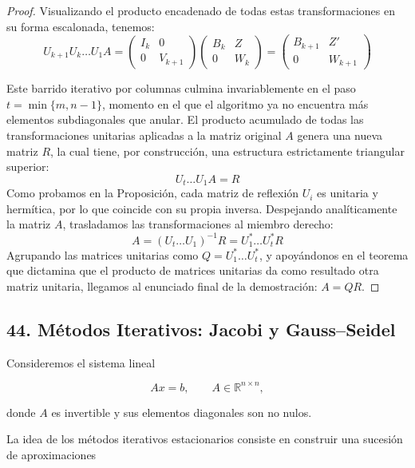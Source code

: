\documentclass[12pt]{article}
\begin{document}
\begin{proof}
Visualizando el producto encadenado de todas estas transformaciones en su forma escalonada, tenemos:
\begin{equation}
U_{k+1} U_k \dots U_1 A = \begin{pmatrix} I_k & 0 \\ 0 & V_{k+1} \end{pmatrix} \begin{pmatrix} B_k & Z \\ 0 & W_k \end{pmatrix} = \begin{pmatrix} B_{k+1} & Z' \\ 0 & W_{k+1} \end{pmatrix}
\end{equation}

Este barrido iterativo por columnas culmina invariablemente en el paso $t = \min\{m, n-1\}$, momento en el que el algoritmo ya no encuentra más elementos subdiagonales que anular. El producto acumulado de todas las transformaciones unitarias aplicadas a la matriz original $A$ genera una nueva matriz $R$, la cual tiene, por construcción, una estructura estrictamente triangular superior:
\begin{equation}
U_t \dots U_1 A = R
\end{equation}
Como probamos en la Proposición, cada matriz de reflexión $U_i$ es unitaria y hermítica, por lo que coincide con su propia inversa. Despejando analíticamente la matriz $A$, trasladamos las transformaciones al miembro derecho:
\begin{equation}
A = (U_t \dots U_1)^{-1} R = U_1^* \dots U_t^* R
\end{equation}
Agrupando las matrices unitarias como $Q = U_1^* \dots U_t^*$, y apoyándonos en el teorema que dictamina que el producto de matrices unitarias da como resultado otra matriz unitaria, llegamos al enunciado final de la demostración: $A = QR$.
\end{proof}


\subsection*{44. Métodos Iterativos: Jacobi y Gauss--Seidel}

Consideremos el sistema lineal

\[
    Ax=b,
    \qquad
    A\in\mathbb{R}^{n\times n},
\]

donde $A$ es invertible y sus elementos diagonales son no nulos.

La idea de los métodos iterativos estacionarios consiste en construir
una sucesión de aproximaciones
\end{document}
